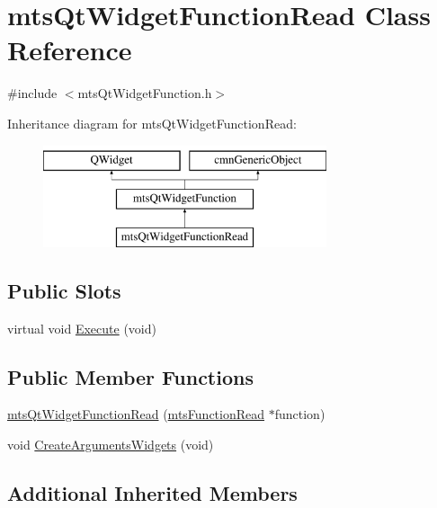 \hypertarget{classmts_qt_widget_function_read}{}\section{mts\+Qt\+Widget\+Function\+Read Class Reference}
\label{classmts_qt_widget_function_read}


{\ttfamily \#include $<$mts\+Qt\+Widget\+Function.\+h$>$}

Inheritance diagram for mts\+Qt\+Widget\+Function\+Read\+:\begin{figure}[H]
\begin{center}
\leavevmode
\includegraphics[height=3.000000cm]{df/d61/classmts_qt_widget_function_read}
\end{center}
\end{figure}
\subsection*{Public Slots}
\begin{DoxyCompactItemize}
\item 
virtual void \hyperlink{classmts_qt_widget_function_read_a9e8b711778c7819e64df3a664df7c3e7}{Execute} (void)
\end{DoxyCompactItemize}
\subsection*{Public Member Functions}
\begin{DoxyCompactItemize}
\item 
\hyperlink{classmts_qt_widget_function_read_a2ede581f357d1a69ec3775ae58ac9834}{mts\+Qt\+Widget\+Function\+Read} (\hyperlink{classmts_function_read}{mts\+Function\+Read} $\ast$function)
\item 
void \hyperlink{classmts_qt_widget_function_read_acc999830d56dc6a29614fcd3bd9a3b0b}{Create\+Arguments\+Widgets} (void)
\end{DoxyCompactItemize}
\subsection*{Additional Inherited Members}


